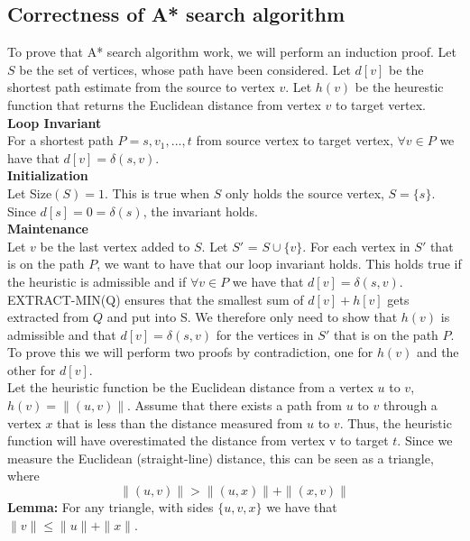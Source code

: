 \documentclass[11pt]{article}
\begin{document}
\subsection{Correctness of A* search algorithm}
To prove that A* search algorithm work, we will perform an induction proof. Let $S$ be the set of vertices, whose path have been considered. Let $d[v]$ be the shortest path estimate from the source to vertex $v$. Let $h(v)$ be the heurestic function that returns the Euclidean distance from vertex $v$ to target vertex.\\

\noindent \textbf{Loop Invariant}\\
For a shortest path $P={s, v_1, ..., t}$ from source vertex to target vertex, $\forall v \in P$ we have that $d[v] = \delta(s,v)$.\\

\noindent \textbf{Initialization}\\
Let Size$(S)=1$. This is true when $S$ only holds the source vertex, $S = \{s\}$. Since $d[s]=0=\delta(s)$, the invariant holds.\\

\noindent \textbf{Maintenance}\\
Let $v$ be the last vertex added to $S$. Let $S'$ = $S \cup \{v\}$. For each vertex in $S'$ that is on the path $P$, we want to have that our loop invariant holds. This holds true if the heuristic is admissible and if $\forall v \in P$ we have that $d[v]=\delta(s,v)$. EXTRACT-MIN(Q) ensures that the smallest sum of $d[v]+h[v]$ gets extracted from $Q$ and put into S. We therefore only need to show that $h(v)$ is admissible and that $d[v]=\delta(s,v)$ for the vertices in $S'$ that is on the path $P$. To prove this we will perform two proofs by contradiction, one for $h(v)$ and the other for $d[v]$.\\

\noindent Let the heuristic function be the Euclidean distance from a vertex $u$ to $v$, $h(v)=\|(u,v)\|$. Assume that there exists a path from $u$ to $v$ through a vertex $x$ that is less than the distance measured from $u$ to $v$. Thus, the heuristic function will have overestimated the distance from vertex v to target $t$. Since we measure the Euclidean (straight-line) distance, this can be seen as a triangle, where $$\|(u,v)\| > \|(u,x)\| + \|(x,v)\|$$\textbf{Lemma:} For any triangle, with sides $\{u,v,x\}$ we have that $\|v\| \leq \|u\| + \|x\|$.\\ 
\end{document}

